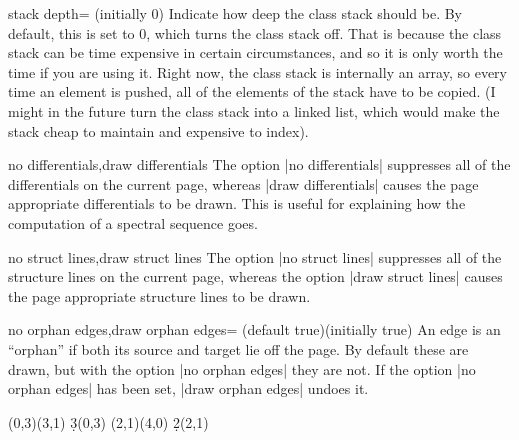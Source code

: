 \documentclass{ltxdoc}
\begin{document}
\begin{sseqdata}[name=ex1,degree={#1}{1-#1}]
\begin{key}{stack depth= (initially 0)}
Indicate how deep the class stack should be. By default, this is set to 0, which turns the class stack off. That is because the class stack can be time expensive in certain circumstances, and so it is only worth the time if you are using it. Right now, the class stack is internally an array, so every time an element is pushed, all of the elements of the stack have to be copied. (I might in the future turn the class stack into a linked list, which would make the stack cheap to maintain and expensive to index).
\end{key}


\begin{keylist}{no differentials,draw differentials}
The option |no differentials| suppresses all of the differentials on the current page, whereas |draw differentials| causes the page appropriate differentials to be drawn. This is useful for explaining how the computation of a spectral sequence goes.
\end{keylist}

\begin{keylist}{no struct lines,draw struct lines}
The option |no struct lines| suppresses all of the structure lines on the current page, whereas the option |draw struct lines| causes the page appropriate structure lines to be drawn.
\end{keylist}

\begin{keylist}{no orphan edges,draw orphan edges= (default true)(initially true)}
An edge is an ``orphan'' if both its source and target lie off the page. By default these are drawn, but with the option |no orphan edges| they are not. If the option |no orphan edges| has been set, |draw orphan edges| undoes it.
\begin{codeexample}[width=10cm]
\begin{sseqdata}[
    name=orphan edges example,
    cohomological Serre grading,
    x range={0}{2}, y range={0}{2}]
\class(0,3)\class(3,1)
\d3(0,3)
\class(2,1)\class(4,0)
\d2(2,1)
\end{sseqdata}
\printpage[name=orphan edges example]
\hskip1cm
\printpage[name=orphan edges example,
    no orphan edges]
\end{codeexample}
\end{keylist}



\end{sseqdata}
\end{document}
